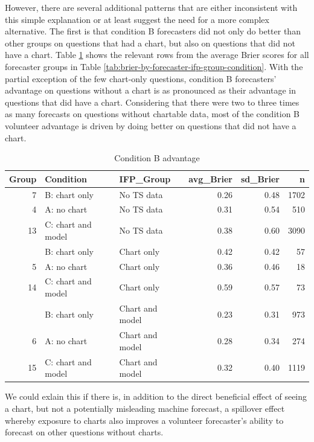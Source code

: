 \documentclass[]{article}
\begin{document}
However, there are several additional patterns that are either
inconsistent with this simple explanation or at least suggest the need
for a more complex alternative. The first is that condition B
forecasters did not only do better than other groups on questions that
had a chart, but also on questions that did not have a chart. Table
\ref{tab:b-advantage} shows the relevant rows from the average Brier
scores for all forecaster groups in Table
\ref{tab:brier-by-forecaster-ifp-group-condition}. With the partial
exception of the few chart-only questions, condition B forecasters'
advantage on questions without a chart is as pronounced as their
advantage in questions that did have a chart. Considering that there
were two to three times as many forecasts on questions without chartable
data, most of the condition B volunteer advantage is driven by doing
better on questions that did not have a chart.

\begin{table}

\caption{\label{tab:b-advantage}Condition B advantage}
\centering
\begin{tabular}[t]{rllrrr}
\toprule
Group & Condition & IFP\_Group & avg\_Brier & sd\_Brier & n\\
\midrule
7 & B: chart only & No TS data & 0.26 & 0.48 & 1702\\
4 & A: no chart & No TS data & 0.31 & 0.54 & 510\\
13 & C: chart and model & No TS data & 0.38 & 0.60 & 3090\\
\addlinespace
8 & B: chart only & Chart only & 0.42 & 0.42 & 57\\
5 & A: no chart & Chart only & 0.36 & 0.46 & 18\\
14 & C: chart and model & Chart only & 0.59 & 0.57 & 73\\
\addlinespace
9 & B: chart only & Chart and model & 0.23 & 0.31 & 973\\
6 & A: no chart & Chart and model & 0.28 & 0.34 & 274\\
15 & C: chart and model & Chart and model & 0.32 & 0.40 & 1119\\
\bottomrule
\end{tabular}
\end{table}

We could exlain this if there is, in addition to the direct beneficial
effect of seeing a chart, but not a potentially misleading machine
forecast, a spillover effect whereby exposure to charts also improves a
volunteer forecaster's ability to forecast on other questions without
charts.
\end{document}
